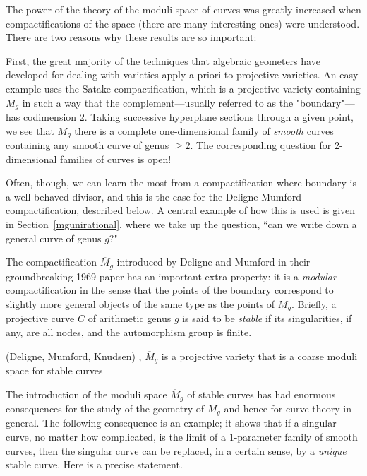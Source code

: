 The power of the theory of the moduli space of curves was greatly increased when compactifications of the space (there are many interesting ones) were understood. There are two reasons why these results are so important:

First, the great majority of the techniques that algebraic geometers have developed for dealing with varieties apply a priori to projective varieties. An easy example uses the Satake compactification, which is a projective variety containing $M_g$ in such a way that the complement---usually referred to as the "boundary"---has codimension 2. Taking successive hyperplane sections through a given point, we see that $M_g$ there is a complete one-dimensional family of \emph{smooth} curves containing any smooth curve of genus $\geq 2$. The corresponding question for 2-dimensional families of curves is open!

Often, though, we can learn the most from a compactification where boundary is a well-behaved divisor, and this is the case for the Deligne-Mumford compactification, described below. A central example of how this is used is given in Section~\ref{mgunirational}, where we take up the question, ``can we write down a general curve of genus $g$?" 

The compactification $\overline M_g$ introduced by Deligne and Mumford in their groundbreaking 1969 paper has an important extra property: it is a \emph{modular}  compactification in the sense that the points of the boundary correspond to slightly more general
objects of the same type as the points of $M_g$. 
Briefly, a projective curve $C$ of arithmetic genus $g$ is said to be \emph{stable} if its singularities, if any, are all nodes, and the automorphism group is finite.

\begin{theorem}(Deligne, Mumford, Knudsen) \cite{Deligne-Mumford}, \cite{MR702954}\label{DM is coarse}
$\overline M_g$ is a projective variety that is a coarse moduli space for stable curves 
\end{theorem}
 
The introduction of the moduli space $\overline M_g$ of stable curves has had enormous consequences for the study of the geometry of $M_g$ and hence for curve theory in general. The following consequence is an example; it shows that if a singular curve, no matter how complicated, is the limit of a 1-parameter family of smooth curves, then the singular curve can be replaced, in a certain sense, by a \emph{unique} stable curve. Here is a precise statement.

